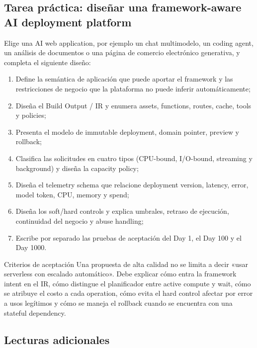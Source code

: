 \subsection{Tarea práctica: diseñar una framework-aware AI deployment platform}

Elige una AI web application, por ejemplo un chat multimodelo, un coding agent, un análisis de documentos o una página de comercio electrónico generativa, y completa el siguiente diseño:

\begin{enumerate}
  \item Define la semántica de aplicación que puede aportar el framework y las restricciones de negocio que la plataforma no puede inferir automáticamente;
  \item Diseña el Build Output / IR y enumera assets, functions, routes, cache, tools y policies;
  \item Presenta el modelo de immutable deployment, domain pointer, preview y rollback;
  \item Clasifica las solicitudes en cuatro tipos (CPU-bound, I/O-bound, streaming y background) y diseña la capacity policy;
  \item Diseña el telemetry schema que relacione deployment version, latency, error, model token, CPU, memory y spend;
  \item Diseña los soft/hard controls y explica umbrales, retraso de ejecución, continuidad del negocio y abuse handling;
  \item Escribe por separado las pruebas de aceptación del Day 1, el Day 100 y el Day 1000.
\end{enumerate}

\begin{knowledgebox}{Criterios de aceptación}
Una propuesta de alta calidad no se limita a decir «usar serverless con escalado automático». Debe explicar cómo entra la framework intent en el IR, cómo distingue el planificador entre active compute y wait, cómo se atribuye el costo a cada operation, cómo evita el hard control afectar por error a usos legítimos y cómo se maneja el rollback cuando se encuentra con una stateful dependency.
\end{knowledgebox}

\subsection{Lecturas adicionales}

